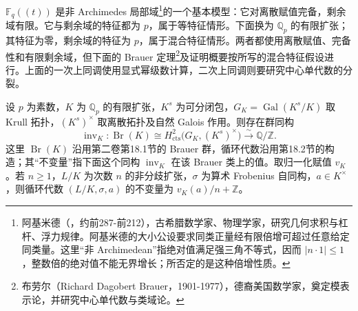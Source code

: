 \(\mathbb F_q(\!(t)\!)\) 是非 Archimedes 局部域\footnote{阿基米德（，约前287-前212），古希腊数学家、物理学家，研究几何求积与杠杆、浮力规律。阿基米德的大小公设要求同类正量经有限倍增可超过任意给定同类量。这里“非 Archimedean”指绝对值满足强三角不等式，因而 \(|n\cdot1|\leq1\)，整数倍的绝对值不能无界增长；所否定的是这种倍增性质。}的一个基本模型：它对离散赋值完备，剩余域有限。它与剩余域的特征都为 \(p\)，属于等特征情形。下面换为 \(\mathbb Q_p\) 的有限扩张；其特征为零，剩余域的特征为 \(p\)，属于混合特征情形。两者都使用离散赋值、完备性和有限剩余域，但下面的 Brauer 定理\footnote{布劳尔（Richard Dagobert Brauer，1901-1977），德裔美国数学家，奠定模表示论，并研究中心单代数与类域论。}及证明概要按所写的混合特征假设进行。上面的一次上同调使用显式幂级数计算，二次上同调则要研究中心单代数的分裂。
\begin{theorem}\label{b4:thm:C-local-brauer-invariant}
	设 \(p\) 为素数，\(K\) 为 \(\mathbb Q_p\) 的有限扩张，\(K^s\) 为可分闭包，\(G_K=\operatorname{Gal}(K^s/K)\) 取 Krull 拓扑，\((K^s)^\times\) 取离散拓扑及自然 Galois 作用。则存在群同构
	\[
		\operatorname{inv}_K:\operatorname{Br}(K) \cong H^2_{\mathrm{cts}}\bigl(G_K,(K^s)^\times\bigr) \xrightarrow{\sim}\mathbb Q/\mathbb Z.
	\]
	这里 \(\operatorname{Br}(K)\) 沿用第二卷第18.1节的 Brauer 群，循环代数沿用第18.2节的构造；其“不变量”指下面这个同构 \(\operatorname{inv}_K\) 在该 Brauer 类上的值。取归一化赋值 \(v_K\)。若 \(n\ge1\)，\(L/K\) 为次数 \(n\) 的非分歧扩张，\(\sigma\) 为算术 Frobenius 自同构，\(a\in K^\times\)，则循环代数 \((L/K,\sigma,a)\) 的不变量为 \(v_K(a)/n+\mathbb Z\)。
\end{theorem}
